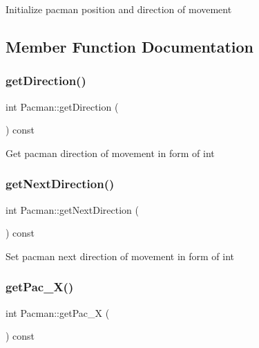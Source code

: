 Initialize pacman position and direction of movement 

\subsection{Member Function Documentation}
\mbox{\label{class_pacman_ab7e69962867252fce2fe615993490918}} 
\subsubsection{\texorpdfstring{get\+Direction()}{getDirection()}}
{\footnotesize\ttfamily int Pacman\+::get\+Direction (\begin{DoxyParamCaption}{ }\end{DoxyParamCaption}) const\hspace{0.3cm}{\ttfamily [inline]}}

Get pacman direction of movement in form of int \mbox{\label{class_pacman_a18fd9d143f06a908da03db6f79e8b617}} 
\subsubsection{\texorpdfstring{get\+Next\+Direction()}{getNextDirection()}}
{\footnotesize\ttfamily int Pacman\+::get\+Next\+Direction (\begin{DoxyParamCaption}{ }\end{DoxyParamCaption}) const\hspace{0.3cm}{\ttfamily [inline]}}

Set pacman next direction of movement in form of int \mbox{\label{class_pacman_a93ca0d51d936c37cec6903766331fd88}} 
\subsubsection{\texorpdfstring{get\+Pac\+\_\+\+X()}{getPac\_X()}}
{\footnotesize\ttfamily int Pacman\+::get\+Pac\+\_\+X (\begin{DoxyParamCaption}{ }\end{DoxyParamCaption}) const\hspace{0.3cm}{\ttfamily [inline]}}

